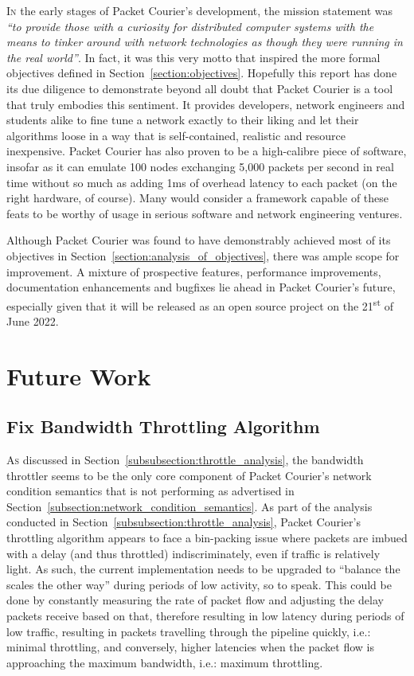 \lettrine{I}{n} the early stages of Packet Courier's development, the mission statement was \emph{``to provide those
with a curiosity for distributed computer systems with the means to tinker around with network technologies as though
they were running in the real world''}. In fact, it was this very motto that inspired the more formal objectives
defined in Section~\ref{section:objectives}. Hopefully this report has done its due diligence to demonstrate beyond
all doubt that Packet Courier is a tool that truly embodies this sentiment. It provides developers, network engineers
and students alike to fine tune a network exactly to their liking and let their algorithms loose in a way that is
self-contained, realistic and resource inexpensive. Packet Courier has also proven to be a high-calibre piece of
software, insofar as it can emulate 100 nodes exchanging 5,000 packets per second in real time without so much as
adding 1ms of overhead latency to each packet (on the right hardware, of course). Many would consider a framework
capable of these feats to be worthy of usage in serious software and network engineering ventures.

Although Packet Courier was found to have demonstrably achieved most of its objectives in
Section~\ref{section:analysis_of_objectives}, there was ample scope for improvement. A mixture of prospective
features, performance improvements, documentation enhancements and bugfixes lie ahead in Packet Courier's future,
especially given that it will be released as an open source project on the 21\textsuperscript{st} of June 2022.


\section{Future Work}\label{section:future_work}

\subsection{Fix Bandwidth Throttling Algorithm}\label{subsection:fix_bandwidth_throttling_algorithm}

\lettrine{A}{s} discussed in Section~\ref{subsubsection:throttle_analysis}, the bandwidth throttler seems to be the
only core component of Packet Courier's network condition semantics that is not performing as advertised in
Section~\ref{subsection:network_condition_semantics}. As part of the analysis conducted in
Section~\ref{subsubsection:throttle_analysis}, Packet Courier's throttling algorithm appears to face a bin-packing
issue where packets are imbued with a delay (and thus throttled) indiscriminately, even if traffic is relatively
light. As such, the current implementation needs to be upgraded to ``balance the scales the other way'' during
periods of low activity, so to speak. This could be done by constantly measuring the rate of packet flow and
adjusting the delay packets receive based on that, therefore resulting in low latency during periods of low traffic,
resulting in packets travelling through the pipeline quickly, i.e.: minimal throttling, and conversely, higher
latencies when the packet flow is approaching the maximum bandwidth, i.e.: maximum throttling.

